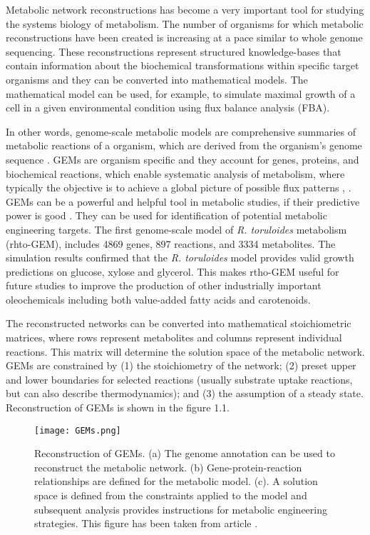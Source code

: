 Metabolic network reconstructions has become a very important tool for studying the systems biology of metabolism. 
The number of organisms for which metabolic reconstructions have been created is increasing at a pace similar to whole genome sequencing. \cite{Thiele2010}
These reconstructions represent structured knowledge-bases that contain information about the biochemical transformations within specific target organisms and they can be converted into mathematical models. The mathematical model can be used, for example, to simulate maximal growth of a cell in a given environmental condition using flux balance analysis (FBA). \cite{Thiele2010}

In other words, genome-scale metabolic models are comprehensive summaries of metabolic reactions of a
organism, which are derived from the organism's genome sequence \cite{Tiukova2019}. 
GEMs are organism specific and they account for genes,
proteins, and biochemical reactions, which enable systematic
analysis of metabolism, where typically
the objective is to achieve a global picture of possible flux
patterns \cite{Kerkhoven2014}, \cite{Chen2023}. GEMs can be a powerful and helpful tool in metabolic studies, if their predictive 
power is
good \cite{Rekena2023}. They can be used for identification of potential metabolic engineering targets.
The first genome-scale model of \textit{R. toruloides} metabolism (rhto-GEM), includes 4869 genes, 
897 reactions, and 3334
metabolites. The simulation results confirmed that the \textit{R. toruloides} model provides valid growth predictions on glucose, 
xylose and glycerol. This makes rtho-GEM useful for future studies to improve the production of other
industrially important oleochemicals including both value-added fatty acids and carotenoids. \cite{Tiukova2019}


The reconstructed networks can be converted into mathematical stoichiometric matrices, where rows represent metabolites 
and columns represent individual reactions. This matrix will
determine the solution space of the metabolic network. GEMs are constrained by (1) the stoichiometry of the
network; (2) preset upper and lower boundaries for selected reactions (usually substrate uptake reactions,
but can also describe thermodynamics); and (3) the assumption of a steady state. \cite{Kerkhoven2014} Reconstruction of GEMs is shown in the figure 1.1.

\begin{figure}
    \texttt{[image: GEMs.png]}
    \caption{Reconstruction of GEMs. (a) The genome annotation can be used 
    to reconstruct the metabolic network. (b) Gene-protein-reaction relationships are defined for the metabolic model. 
     (c). A solution space is defined from the constraints applied to the model and subsequent 
    analysis provides instructions for metabolic engineering strategies. This figure has been taken from article \cite{Kerkhoven2014}.}
    \label{GEMs}
\end{figure}


